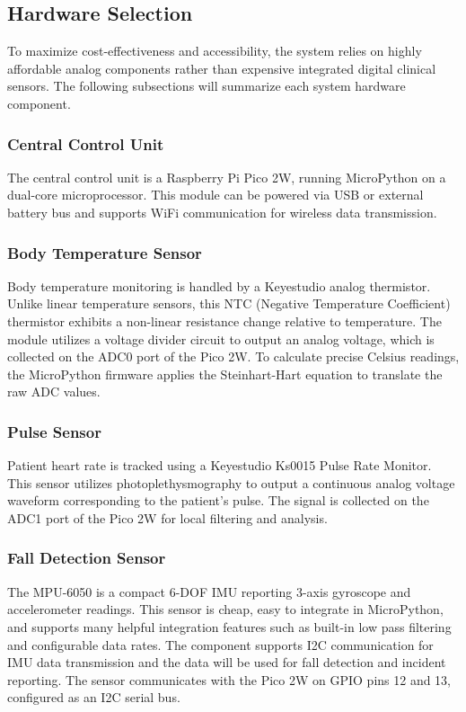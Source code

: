 \documentclass[conference]{IEEEtran}
\begin{document}
\subsection{Hardware Selection}
To maximize cost-effectiveness and accessibility, the system relies on highly affordable analog components rather than expensive integrated digital clinical sensors. The following subsections will summarize each system hardware component. 

\subsubsection{Central Control Unit}
The central control unit is a Raspberry Pi Pico 2W, running MicroPython on a dual-core microprocessor. This module can be powered via USB or external battery bus and supports WiFi communication for wireless data transmission.

\subsubsection{Body Temperature Sensor}
Body temperature monitoring is handled by a Keyestudio analog thermistor. Unlike linear temperature sensors, this NTC (Negative Temperature Coefficient) thermistor exhibits a non-linear resistance change relative to temperature. The module utilizes a voltage divider circuit to output an analog voltage, which is collected on the ADC0 port of the Pico 2W. To calculate precise Celsius readings, the MicroPython firmware applies the Steinhart-Hart equation to translate the raw ADC values.

\subsubsection{Pulse Sensor}
Patient heart rate is tracked using a Keyestudio Ks0015 Pulse Rate Monitor. This sensor utilizes photoplethysmography to output a continuous analog voltage waveform corresponding to the patient's pulse. The signal is collected on the ADC1 port of the Pico 2W for local filtering and analysis.

\subsubsection{Fall Detection Sensor}
The MPU-6050 is a compact 6-DOF IMU reporting 3-axis gyroscope and accelerometer readings. This sensor is cheap, easy to integrate in MicroPython, and supports many helpful integration features such as built-in low pass filtering and configurable data rates. The component supports I2C communication for IMU data transmission and the data will be used for fall detection and incident reporting. The sensor communicates with the Pico 2W on GPIO pins 12 and 13, configured as an I2C serial bus.
\end{document}
